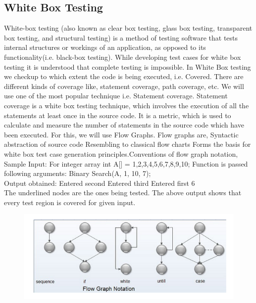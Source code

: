 \documentclass[a4paper,12pt]{article}
\begin{document}
	\subsection{White Box Testing}
	White-box testing (also known as clear box testing, glass box testing, transparent box testing, and structural testing) is a method of testing software that tests internal structures or workings of an application, as opposed to its functionality(i.e. black-box testing). While developing 
	test cases for white box testing it is understood that complete testing 
	is impossible. In White Box testing we checkup to which extent the code 
	is being executed, i.e. Covered. There are different kinds of coverage like, statement coverage, path coverage, etc. We will use one of the most popular technique i.e. Statement coverage. Statement coverage is a white box testing technique, which involves the execution of all the statements at least once in the source code. It is a metric, which is used to calculate and measure the number of statements in the source code which have been executed. For this, we will use Flow Graphs. Flow graphs are, Syntactic abstraction of source code Resembling to classical flow charts Forms the basis for white box test case generation principles.Conventions of flow graph notation, \\
	Sample Input: For integer array int A[] = 1,2,3,4,5,6,7,8,9,10; Function 
	is passed\\
	following arguments: Binary Search(A, 1, 10, 7);\\
	Output obtained: Entered second Entered third Entered first 6\\
	The underlined nodes are the ones being tested. The above output shows
	that every test region is covered for given input.\\
	
	\begin{figure}[h!]
		\centering
		\includegraphics[scale=0.5]{pqr.png}
		\end{figure}
		
\end{document}
